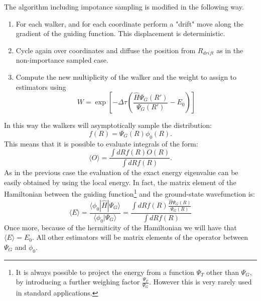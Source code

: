 The algorithm including impotance sampling is modified in the following way.
\begin{enumerate}
\item
   For each walker, and for each coordinate perform a "drift" move along the
   gradient of the guiding function. This displacement is deterministic.
\begin{svgraybox}
 	\begin{algorithmic} 
 		\EndFor
 		\EndFor
 	\end{algorithmic}
\end{svgraybox}
\item
Cycle again over coordinates and diffuse the position from $R_{drift}$ as in the non-importance sampled case.
\item
Compute the new multiplicity of the walker and the weight to assign to estimators using
\begin{equation}
W=\exp\left[-\Delta\tau\left(\frac{\hat{H}\Psi_G(R')}{\Psi_G(R')}-E_0\right)\right]
\end{equation}
\end{enumerate}
In this way the walkers will asymptotically sample the distribution:
\begin{equation}
f(R)=\Psi_G(R)\phi_0(R).
\end{equation}
This means that it is possible to evaluate integrals of the form:
\begin{equation}
\langle O\rangle=\frac{\int dR f(R) O(R)}{\int dR f(R)}.
\end{equation}
As in the previous case the evaluation of the exact energy eigenvalue can be easily obtained by using the local energy. In fact, the matrix element of the Hamiltonian between the guiding function\footnote{It is always possible to project the energy from a function $\Psi_T$ other than $\Psi_G$, by introducing a further weighing factor $\frac{\Psi_T}{\Psi_G}$. However this is very rarely used in standard applications.}  and the ground-state wavefunction is:  
\begin{equation}
\langle E\rangle =\frac{\langle \phi_0|\hat{H}|\Psi_G\rangle}{\langle \phi_0|\Psi_G\rangle}=\frac{\int dR f(R)\frac{\hat{H}\Psi_G(R)}{\Psi_G(R)}}{\int dR f(R)}
\end{equation}
Once more, because of the hermiticity of the Hamiltonian we will have that $\langle E\rangle =E_0$. All other estimators will be matrix elements of the operator between $\Psi_G$ and $\phi_0$. 


